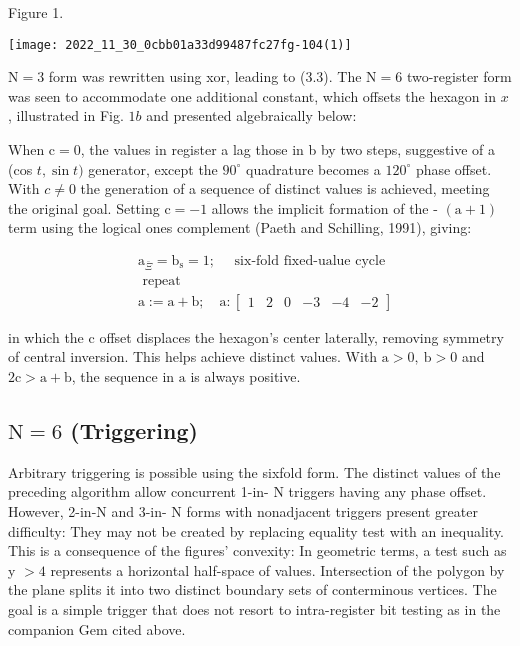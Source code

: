 \begin{CJK}{UTF8}{gbsn}
Figure 1.

\begin{center}
\texttt{[image: 2022\_11\_30\_0cbb01a33d99487fc27fg-104(1)]}
\end{center}

$\mathrm{N}=3$ form was rewritten using xor, leading to (3.3). The $\mathrm{N}=6$ two-register form was seen to accommodate one additional constant, which offsets the hexagon in $x$, illustrated in Fig. $1 b$ and presented algebraically below:

When $\mathrm{c}=0$, the values in register a lag those in b by two steps, suggestive of a (cos $t, \sin t)$ generator, except the $90^{\circ}$ quadrature becomes a $120^{\circ}$ phase offset. With $c \neq 0$ the generation of a sequence of distinct values is achieved, meeting the original goal. Setting $\mathrm{c}=-1$ allows the implicit formation of the - $(\mathrm{a}+1)$ term using the logical ones complement (Paeth and Schilling, 1991), giving:

$$
\begin{aligned}
& \mathrm{a}_{\bar{\Xi}}=\mathrm{b}_{\mathrm{s}}=1 ; \quad \text { six-fold fixed-ualue cycle } \\
& \text { repeat } \\
& \mathrm{a}:=\mathrm{a}+\mathrm{b} ; \quad \mathrm{a}:\left[\begin{array}{llllll}1 & 2 & 0 & -3 & -4 & -2\end{array}\right]
\end{aligned}
$$

in which the c offset displaces the hexagon's center laterally, removing symmetry of central inversion. This helps achieve distinct values. With $\mathrm{a}>0, \mathrm{~b}>0$ and $2 \mathrm{c}>\mathrm{a}+\mathrm{b}$, the sequence in $\mathrm{a}$ is always positive.

\subsection*{$\mathrm{N}=6$ (Triggering)}
Arbitrary triggering is possible using the sixfold form. The distinct values of the preceding algorithm allow concurrent 1-in- $\mathrm{N}$ triggers having any phase offset. However, 2-in-N and 3-in- $\mathrm{N}$ forms with nonadjacent triggers present greater difficulty: They may not be created by replacing equality test with an inequality. This is a consequence of the figures' convexity: In geometric terms, a test such as y $>4$ represents a horizontal half-space of values. Intersection of the polygon by the plane splits it into two distinct boundary sets of conterminous vertices. The goal is a simple trigger that does not resort to intra-register bit testing as in the companion Gem cited above.


\end{CJK}
